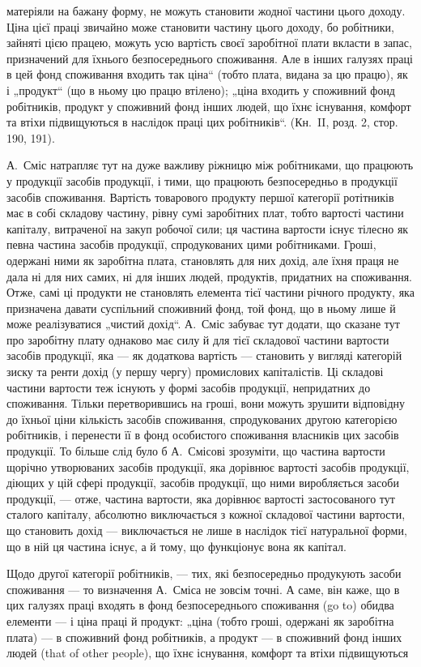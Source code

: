 \parcont{}  %
матеріяли на бажану форму, не можуть становити жодної частини цього
доходу. Ціна цієї праці звичайно може становити частину цього доходу,
бо робітники, зайняті цією працею, можуть усю вартість своєї заробітної
плати вкласти в запас, призначений для їхнього безпосереднього споживання.
Але в інших галузях праці в цей фонд споживання входить так
ціна“ (тобто плата, видана за цю працю), як і „продукт“ (що в
ньому цю працю втілено); „ціна входить у споживний фонд робітників,
продукт у споживний фонд інших людей, що їхнє існування, комфорт
та втіхи підвищуються в наслідок праці цих робітників“. (Кн.~II, розд. 2,
стор. 190, 191).

А.~Сміс натрапляє тут на дуже важливу ріжницю між робітниками,
що працюють у продукції засобів продукції, і тими, що працюють
безпосередньо в продукції засобів споживання. Вартість
товарового продукту першої категорії ротітників має в собі складову
частину, рівну сумі заробітних плат, тобто вартості частини капіталу,
витраченої на закуп робочої сили; ця частина вартости існує тілесно як
певна частина засобів продукції, спродукованих цими робітниками. Гроші,
одержані ними як заробітна плата, становлять для них дохід, але їхня
праця не дала ні для них самих, ні для інших людей, продуктів, придатних
на споживання. Отже, самі ці продукти не становлять елемента
тієї частини річного продукту, яка призначена давати суспільний споживний
фонд, той фонд, що в ньому лише й може реалізуватися „чистий
дохід“. А.~Сміс забуває тут додати, що сказане тут про заробітну
плату однаково має силу й для тієї складової частини вартости засобів
продукції, яка — як додаткова вартість — становить у вигляді категорій
зиску та ренти дохід (у першу чергу) промислових капіталістів. Ці складові
частини вартости теж існують у формі засобів продукції, непридатних
до споживання. Тільки перетворившись на гроші, вони можуть
зрушити відповідну до їхньої ціни кількість засобів споживання, спродукованих
другою категорією робітників, і перенести її в фонд особистого
споживання власників цих засобів продукції. То більше слід було б
А.~Смісові зрозуміти, що частина вартости щорічно утворюваних засобів
продукції, яка дорівнює вартості засобів продукції, діющих у цій сфері
продукції, засобів продукції, що ними виробляється засоби продукції, —
отже, частина вартости, яка дорівнює вартості застосованого тут сталого
капіталу, абсолютно виключається з кожної складової частини вартости,
що становить дохід — виключається не лише в наслідок тієї натуральної
форми, що в ній ця частина існує, а й тому, що функціонує вона як
капітал.

Щодо другої категорії робітників, — тих, які безпосередньо продукують
засоби споживання — то визначення А.~Сміса не зовсім точні.
А саме, він каже, що в цих галузях праці входять в фонд безпосереднього
споживання (go to) обидва елементи — і ціна праці й продукт:
„ціна (тобто гроші, одержані як заробітна плата) — в споживний фонд
робітників, а продукт — в споживний фонд інших людей
(that of other people), що їхнє існування, комфорт та втіхи підвищуються
\parbreak{}  %
